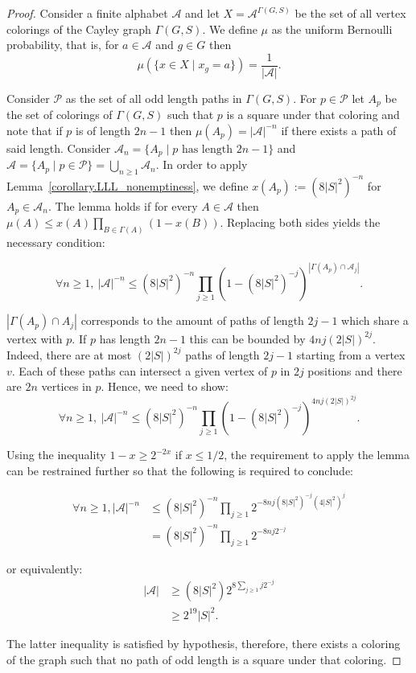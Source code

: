 \documentclass[letterpaper]{article}
\theoremstyle{plain}
\def\ag{\mathcal{A}}
\newcommand{\cor}[2][]{#2}
\begin{document}
		\begin{proof}
			Consider a finite alphabet $\ag$ and let $X = \ag^{\Gamma(G,S)}$ be the set of all vertex colorings of the Cayley graph $\Gamma(G,S)$. We define $\mu$ as the uniform Bernoulli probability, that is, for $a \in \ag$ and $g \in G$ then $$\mu( \{x \in X \mid x_g = a  \} ) = \frac{1}{|\ag|}.$$
			
			Consider $\mathcal{P}$ as the set of all odd length paths in $\Gamma(G,S)$. For $p \in \mathcal{P}$ let $A_{p}$ be the set of colorings of $\Gamma(G,S)$ such that $p$ is a square under that coloring and note that if $p$ is of length $2n-1$ then $\mu(A_p)= |\ag|^{-n}$ if there exists a path of said length. Consider $\ag_n= \{ A_p \mid p \text{ has length } 2n-1 \}$ and $\mathscr{A} = \{ A_p \mid p \in \mathcal{P}\} = \bigcup_{n \geq 1}\ag_n$. In order to apply Lemma~\ref{corollary.LLL_nonemptiness}, we define  $x(A_p) := (8|S|^2)^{-n}$ for $A_p \in \ag_n$. The lemma holds if for every $A \in \mathscr{A}$ then $\mu(A) \leq x(A)\prod_{B \in \Gamma(A)}(1-x(B))$. Replacing both sides yields the necessary condition:
			
			$$\forall n \geq 1, \ |\ag|^{-n} \leq (8|S|^2)^{-n}\prod_{j \geq 1}(1-(8|S|^2)^{-j})^{|\Gamma(A_p)\cap \ag_j|}.$$
			
			$|\Gamma(A_p)\cap A_j|$ corresponds to the amount of paths of length $2j-1$ which share a vertex with $p$. If $p$ has length $2n-1$ this can be bounded by $4nj(2|S|)^{2j}$. Indeed, there are at most $(2|S|)^{2j}$ paths of length $2j-1$ starting from a vertex $v$. Each of these paths can intersect a given vertex of $p$ in $2j$ positions and there are $2n$ vertices in $p$. \cor[]{Hence, we need to show: $$\forall n \geq 1, \ |\ag|^{-n} \leq (8|S|^2)^{-n}\prod_{j \geq 1}(1-(8|S|^2)^{-j})^{4nj(2|S|)^{2j}}.$$}
			
			
			 Using the inequality $1-x \geq 2^{-2x}$ if $x \leq 1/2$, the requirement to apply the lemma can be restrained further so that the following is required to conclude:
			
			\cor[]{\begin{align*}
				\forall n \geq 1, |\ag|^{-n} & \leq (8|S|^2)^{-n}\prod_{j \geq 1}2^{-8nj(8|S|^2)^{-j}(4|S|^2)^{j}}\\ & = (8|S|^2)^{-n}\prod_{j \geq 1}2^{-8nj2^{-j}}
				\end{align*}
				}
			
			\cor[E]{or e}quivalently:\begin{align*}
			|\ag| &\geq (8|S|^2) 2^{8\sum_{j \geq 1}{j2^{-j} } }\\
			& \geq 2^{19}|S|^2\cor{.}
			\end{align*} 
			
			\cor[Which]{The latter inequality} is satisfied by hypothesis, therefore, there exists a coloring of the graph such that no path of odd length is a square under that coloring.\end{proof}
\end{document}
